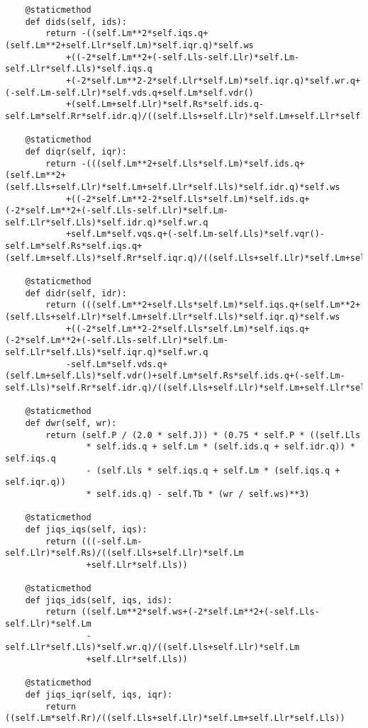\begin{lstlisting}
    @staticmethod
    def dids(self, ids):
        return -((self.Lm**2*self.iqs.q+(self.Lm**2+self.Llr*self.Lm)*self.iqr.q)*self.ws
	        +((-2*self.Lm**2+(-self.Lls-self.Llr)*self.Lm-self.Llr*self.Lls)*self.iqs.q
		    +(-2*self.Lm**2-2*self.Llr*self.Lm)*self.iqr.q)*self.wr.q+(-self.Lm-self.Llr)*self.vds.q+self.Lm*self.vdr()
		    +(self.Lm+self.Llr)*self.Rs*self.ids.q-self.Lm*self.Rr*self.idr.q)/((self.Lls+self.Llr)*self.Lm+self.Llr*self.Lls)

    @staticmethod
    def diqr(self, iqr):
        return -(((self.Lm**2+self.Lls*self.Lm)*self.ids.q+(self.Lm**2+(self.Lls+self.Llr)*self.Lm+self.Llr*self.Lls)*self.idr.q)*self.ws
	        +((-2*self.Lm**2-2*self.Lls*self.Lm)*self.ids.q+(-2*self.Lm**2+(-self.Lls-self.Llr)*self.Lm-self.Llr*self.Lls)*self.idr.q)*self.wr.q
	        +self.Lm*self.vqs.q+(-self.Lm-self.Lls)*self.vqr()-self.Lm*self.Rs*self.iqs.q+(self.Lm+self.Lls)*self.Rr*self.iqr.q)/((self.Lls+self.Llr)*self.Lm+self.Llr*self.Lls)

    @staticmethod
    def didr(self, idr):
        return (((self.Lm**2+self.Lls*self.Lm)*self.iqs.q+(self.Lm**2+(self.Lls+self.Llr)*self.Lm+self.Llr*self.Lls)*self.iqr.q)*self.ws
	        +((-2*self.Lm**2-2*self.Lls*self.Lm)*self.iqs.q+(-2*self.Lm**2+(-self.Lls-self.Llr)*self.Lm-self.Llr*self.Lls)*self.iqr.q)*self.wr.q
	        -self.Lm*self.vds.q+(self.Lm+self.Lls)*self.vdr()+self.Lm*self.Rs*self.ids.q+(-self.Lm-self.Lls)*self.Rr*self.idr.q)/((self.Lls+self.Llr)*self.Lm+self.Llr*self.Lls)

    @staticmethod
    def dwr(self, wr):
        return (self.P / (2.0 * self.J)) * (0.75 * self.P * ((self.Lls
                * self.ids.q + self.Lm * (self.ids.q + self.idr.q)) * self.iqs.q
                - (self.Lls * self.iqs.q + self.Lm * (self.iqs.q + self.iqr.q))
                * self.ids.q) - self.Tb * (wr / self.ws)**3)

    @staticmethod
    def jiqs_iqs(self, iqs):
        return (((-self.Lm-self.Llr)*self.Rs)/((self.Lls+self.Llr)*self.Lm
                +self.Llr*self.Lls))

    @staticmethod
    def jiqs_ids(self, iqs, ids):
        return ((self.Lm**2*self.ws+(-2*self.Lm**2+(-self.Lls-self.Llr)*self.Lm
                -self.Llr*self.Lls)*self.wr.q)/((self.Lls+self.Llr)*self.Lm
                +self.Llr*self.Lls))

    @staticmethod
    def jiqs_iqr(self, iqs, iqr):
        return 	((self.Lm*self.Rr)/((self.Lls+self.Llr)*self.Lm+self.Llr*self.Lls))


\end{lstlisting}
